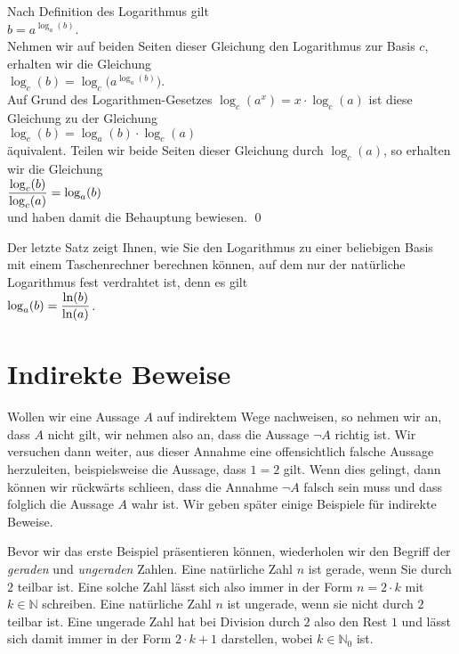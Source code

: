 \proof
Nach Definition des Logarithmus gilt
\\[0.2cm]
\hspace*{1.3cm}
$b = a^{\log_a(b)}$.
\\[0.2cm]
Nehmen  wir auf beiden Seiten dieser Gleichung den Logarithmus zur Basis $c$, erhalten wir die Gleichung
\\[0.2cm]
\hspace*{1.3cm}
$\log_c(b) = \log_c\bigl(a^{\log_a(b)}\bigr)$.
\\[0.2cm]
Auf Grund des Logarithmen-Gesetzes $\log_c(a^x) = x \cdot \log_c(a)$ ist diese Gleichung zu
der  Gleichung
\\[0.2cm]
\hspace*{1.3cm}
$\log_c(b) = \log_a(b) \cdot \log_c(a)$
\\[0.2cm]
\"{a}quivalent.  Teilen wir beide Seiten dieser Gleichung durch $\log_c(a)$, so erhalten wir die Gleichung
\\[0.2cm]
\hspace*{1.3cm}
$\displaystyle\frac{\log_c(b)}{\log_c(a)} = \log_a(b)$
\\[0.2cm]
und haben damit die Behauptung bewiesen.
\qed

\remark
Der letzte Satz zeigt Ihnen, wie Sie den Logarithmus zu einer beliebigen Basis mit einem
Taschenrechner berechnen k\"{o}nnen, auf dem nur der nat\"{u}rliche Logarithmus fest verdrahtet ist, denn es gilt
\\[0.2cm]
\hspace*{1.3cm}
$\displaystyle\log_a(b) = \frac{\ln(b)}{\ln(a)}$.
\eox


\section{Indirekte Beweise}
Wollen wir eine Aussage $A$ auf indirektem Wege nachweisen, so nehmen wir an, dass $A$
nicht gilt, wir nehmen also an, dass die Aussage $\neg A$ richtig ist.  Wir versuchen dann
weiter, aus dieser Annahme eine offensichtlich falsche Aussage herzuleiten, beispielsweise
die Aussage, dass $1 = 2$ gilt.  Wenn dies gelingt, dann k\"{o}nnen wir r\"{u}ckw\"{a}rts schlie\3en,
dass die Annahme $\neg A$ falsch sein muss und dass folglich die Aussage $A$ wahr ist.
Wir geben sp\"{a}ter einige Beispiele f\"{u}r indirekte Beweise.
\vspace*{0.2cm}

Bevor wir das erste Beispiel pr\"{a}sentieren k\"{o}nnen, wiederholen wir den Begriff der \emph{geraden} und
\emph{ungeraden} Zahlen.  Eine nat\"{u}rliche Zahl $n$ ist gerade, wenn Sie durch $2$ teilbar ist.  Eine
solche Zahl l\"{a}sst sich also immer in der Form $n = 2 \cdot k$ mit $k \in \mathbb{N}$ schreiben.
Eine nat\"{u}rliche Zahl $n$  ist ungerade, wenn sie nicht durch $2$ teilbar ist.  Eine ungerade Zahl
hat bei Division durch $2$ also den Rest $1$ und l\"{a}sst sich damit immer in der Form $2 \cdot k + 1$
darstellen, wobei $k \in \mathbb{N}_0$ ist.

